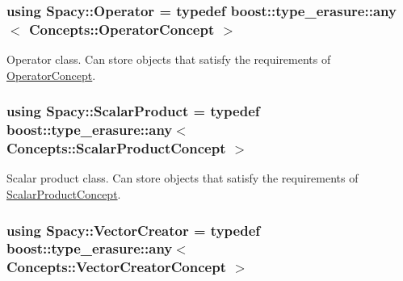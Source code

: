 \subsubsection[{Operator}]{\setlength{\rightskip}{0pt plus 5cm}using {\bf Spacy\+::\+Operator} = typedef boost\+::type\+\_\+erasure\+::any$<$ {\bf Concepts\+::\+Operator\+Concept} $>$}\label{group__SpacyGroup_ga3f89622eba80cf840b2a7102f1303455_ga3f89622eba80cf840b2a7102f1303455}


Operator class. Can store objects that satisfy the requirements of \hyperlink{group__ConceptGroup_ga7d984281b647a6d8e4c0a7ea5faeb90e_OperatorConceptAnchor}{Operator\+Concept}. 

\label{group__SpacyGroup_ga3f89622eba80cf840b2a7102f1303455_OperatorAnchor}%
\hypertarget{group__SpacyGroup_ga3f89622eba80cf840b2a7102f1303455_OperatorAnchor}{}%
\hypertarget{group__SpacyGroup_ga9fe0b4de20da1ab1ca3d04a0f96343e1_ga9fe0b4de20da1ab1ca3d04a0f96343e1}{}
\subsubsection[{Scalar\+Product}]{\setlength{\rightskip}{0pt plus 5cm}using {\bf Spacy\+::\+Scalar\+Product} = typedef boost\+::type\+\_\+erasure\+::any$<$ {\bf Concepts\+::\+Scalar\+Product\+Concept} $>$}\label{group__SpacyGroup_ga9fe0b4de20da1ab1ca3d04a0f96343e1_ga9fe0b4de20da1ab1ca3d04a0f96343e1}


Scalar product class. Can store objects that satisfy the requirements of \hyperlink{group__ConceptGroup_ga1308724cda3078f228fb05c29556805d_ScalarProductConceptAnchor}{Scalar\+Product\+Concept}. 

\label{group__SpacyGroup_ga9fe0b4de20da1ab1ca3d04a0f96343e1_ScalarProductAnchor}%
\hypertarget{group__SpacyGroup_ga9fe0b4de20da1ab1ca3d04a0f96343e1_ScalarProductAnchor}{}%
\hypertarget{group__SpacyGroup_ga1f5316487c031a478247206764bb2efb_ga1f5316487c031a478247206764bb2efb}{}
\subsubsection[{Vector\+Creator}]{\setlength{\rightskip}{0pt plus 5cm}using {\bf Spacy\+::\+Vector\+Creator} = typedef boost\+::type\+\_\+erasure\+::any$<$ {\bf Concepts\+::\+Vector\+Creator\+Concept} $>$}\label{group__SpacyGroup_ga1f5316487c031a478247206764bb2efb_ga1f5316487c031a478247206764bb2efb}


